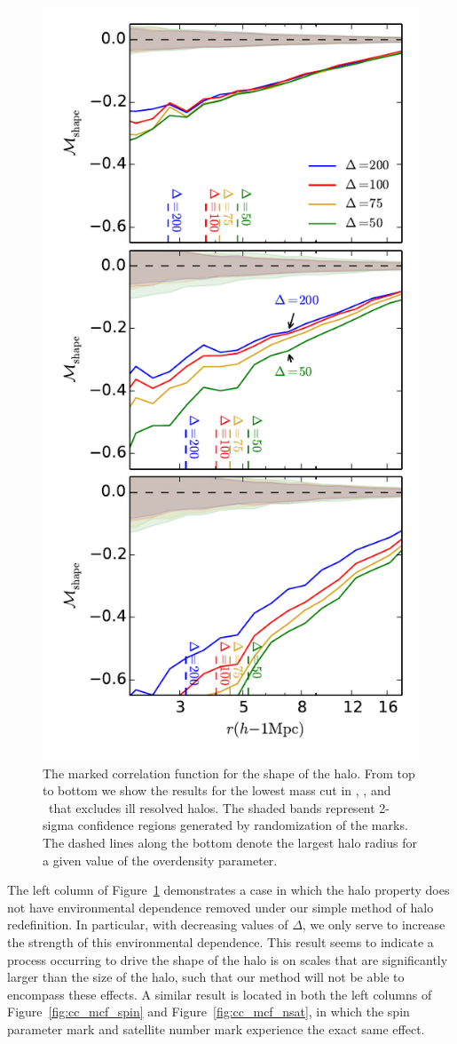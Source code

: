 \documentclass[usenatbib,usegraphicx,letterpaper]{mn2e}
\begin{document}
\begin{figure}
	\centering
	\includegraphics[width=.4\textwidth]{all_mcf_s_z00_cutcomp.pdf}
	\caption{The marked correlation function for the shape of the halo. From top to bottom we show the results for the lowest mass cut in \simA, \simB, and \simC \ that excludes ill resolved halos. The shaded bands represent 2-sigma confidence regions generated by randomization of the marks. The dashed lines along the bottom denote the largest halo radius for a given value of the overdensity parameter.}
	\label{fig:cc_mcf_s}
\end{figure}

The left column of Figure~\ref{fig:cc_mcf_s} demonstrates a case in which the halo property does not have environmental dependence removed under our simple method of halo redefinition. In particular, with decreasing values of $\Delta$, we only serve to increase the strength of this environmental dependence. This result seems to indicate a process occurring to drive the shape of the halo is on scales that are significantly larger than the size of the halo, such that our method will not be able to encompass these effects. A similar result is located in both the left columns of Figure~\ref{fig:cc_mcf_spin} and Figure~\ref{fig:cc_mcf_nsat}, in which the spin parameter mark and satellite number mark experience the exact same effect.
\end{document}
